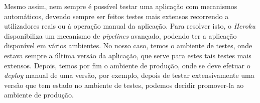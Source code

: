 Mesmo assim, nem sempre é possível testar uma aplicação com mecanismos automáticos, devendo sempre ser feitos testes mais extensos recorrendo a utilizadores reais ou à operação manual da aplicação. Para resolver isto, o \textit{Heroku} disponibiliza um mecanismo de \textit{pipelines} avançado, podendo ter a aplicação disponível em vários ambientes. No nosso caso, temos o ambiente de testes, onde estava sempre a última versão da aplicação, que serve para estes tais testes mais extensos. Depois, temos por fim o ambiente de produção, onde se deve efetuar o \textit{deploy} manual de uma versão, por exemplo, depois de testar extensivamente uma versão que tem estado no ambiente de testes, podemos decidir promover-la ao ambiente de produção.

